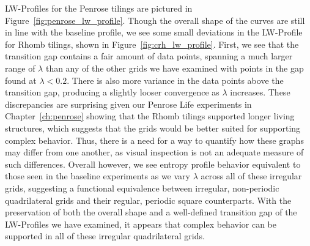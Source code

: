 \documentclass[a4paper,11pt]{report}
\begin{document}
LW-Profiles for the Penrose tilings are pictured in Figure~\ref{fig:penrose_lw_profile}. Though the overall shape of the curves are still in line with the baseline profile, we see some small deviations in the LW-Profile for Rhomb tilings, shown in Figure~\ref{fig:crh_lw_profile}. First, we see that the transition gap contains a fair amount of data points, spanning a much larger range of $\lambda$ than any of the other grids we have examined with points in the gap found at $\lambda < 0.2$. There is also more variance in the data points above the transition gap, producing a slightly looser convergence as $\lambda$ increases. These discrepancies are surprising given our Penrose Life experiments in Chapter~\ref{ch:penrose} showing that the Rhomb tilings supported longer living structures, which suggests that the grids would be better suited for supporting complex behavior. Thus, there is a need for a way to quantify how these graphs may differ from one another, as visual inspection is not an adequate measure of such differences. Overall however, we see entropy profile behavior equivalent to those seen in the baseline experiments as we vary $\lambda$ across all of these irregular grids, suggesting a functional equivalence between irregular, non-periodic quadrilateral grids and their regular, periodic square counterparts. With the preservation of both the overall shape and a well-defined transition gap of the LW-Profiles we have examined, it appears that complex behavior can be supported in all of these irregular quadrilateral grids.
\end{document}
